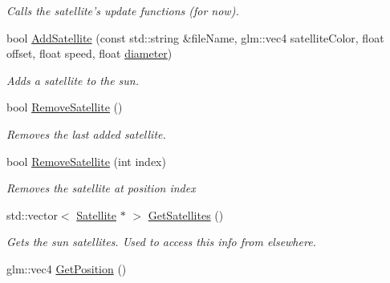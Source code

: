 \begin{DoxyCompactItemize}
\begin{DoxyCompactList}\small\item\em Calls the satellite's update functions (for now). \end{DoxyCompactList}\item 
bool \hyperlink{class_sun_a7f287e1cb43a95e9fbadd38feb8df6bc}{Add\-Satellite} (const std\-::string \&file\-Name, glm\-::vec4 satellite\-Color, float offset, float speed, float \hyperlink{class_sun_ac35fc9ebc427d9c8c9fd3ee3a12fce82}{diameter})
\begin{DoxyCompactList}\small\item\em Adds a satellite to the sun. \end{DoxyCompactList}\item 
\hypertarget{class_sun_a274dd9d397333db6a916582ac2a19c46}{bool \hyperlink{class_sun_a274dd9d397333db6a916582ac2a19c46}{Remove\-Satellite} ()}\label{class_sun_a274dd9d397333db6a916582ac2a19c46}

\begin{DoxyCompactList}\small\item\em Removes the last added satellite. \end{DoxyCompactList}\item 
\hypertarget{class_sun_ad0ab7130cbb46b50968efe2d770c4b21}{bool \hyperlink{class_sun_ad0ab7130cbb46b50968efe2d770c4b21}{Remove\-Satellite} (int index)}\label{class_sun_ad0ab7130cbb46b50968efe2d770c4b21}

\begin{DoxyCompactList}\small\item\em Removes the satellite at position {\ttfamily index} \end{DoxyCompactList}\item 
\hypertarget{class_sun_a69fc54810b99f61d33be2dafafa3273d}{std\-::vector$<$ \hyperlink{class_satellite}{Satellite} $\ast$ $>$ \hyperlink{class_sun_a69fc54810b99f61d33be2dafafa3273d}{Get\-Satellites} ()}\label{class_sun_a69fc54810b99f61d33be2dafafa3273d}

\begin{DoxyCompactList}\small\item\em Gets the sun satellites. Used to access this info from elsewhere. \end{DoxyCompactList}\item 
\hypertarget{class_sun_a8b531f7cf5b4b39ab1f5f453894f52bd}{glm\-::vec4 \hyperlink{class_sun_a8b531f7cf5b4b39ab1f5f453894f52bd}{Get\-Position} ()}\label{class_sun_a8b531f7cf5b4b39ab1f5f453894f52bd}


\end{DoxyCompactItemize}
